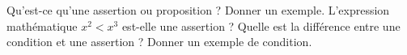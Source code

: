 %
%
	\begin{tasks}
		\task Qu'est-ce qu'une assertion ou proposition ?
		\task Donner un exemple.
		\task L'expression mathématique $x^2 < x^3$ est-elle une assertion ?
		\task Quelle est la différence entre une condition et une assertion ?
		\task Donner un exemple de condition.
	\end{tasks}
